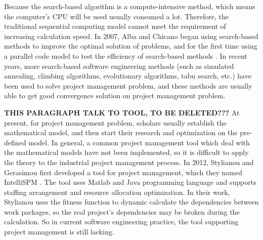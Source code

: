 Because the search-based algorithm is a compute-intensive method, which means 
the computer's CPU will be used usually consumed a lot. Therefore, the 
traditional sequential computing model cannot meet the requirement of 
increasing calculation speed. In 2007, Alba and Chicano began using search-based
 methods to improve the optimal solution of problems, and for 
the first time using a parallel code model to test the efficiency of search-based 
methods \cite{pospichal}. In recent years, more search-based software 
engineering methods (such as simulated annealing, climbing algorithms, 
evolutionary algorithms, tabu search, etc.) have been used to solve project 
management problem, and these methods are usually able to get good 
convergence solution on project management problem.


\textbf{THIS PARAGRAPH TALK TO TOOL, TO BE DELETED???}
At present, for project management problem, scholars usually establish the
mathematical model, and then start their research and optimization on the
pre-defined model. In general, a common project management tool which deal with
the mathematical models have not been implemented, so it is difficult to apply
the theory to the industrial project management process. In 2012, Stylianou and
Gerasimou first developed a tool for project management, which they named
IntelliSPM \cite{stylianou}. The tool uses Matlab and Java programming language and 
supports staffing arrangement and resource allocation optimization. In
their work, Stylianou uses the fitness function to dynamic calculate the
dependencies between work packages, so the real project's dependencies may be
broken during the calculation. So in current software engineering practice, the
tool supporting project management is still lacking.

